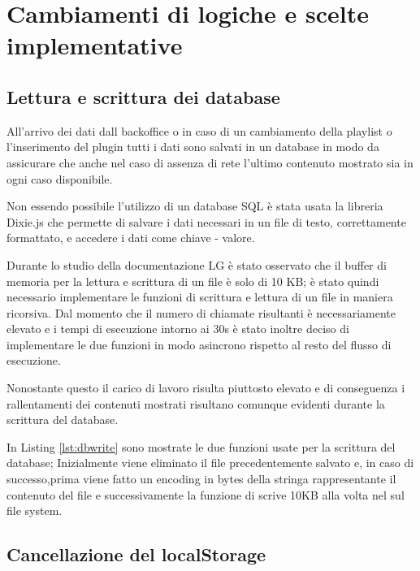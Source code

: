 \section{Cambiamenti di logiche e scelte implementative}
\subsection{Lettura e scrittura dei database} \label{database}

All'arrivo dei dati dall backoffice o in caso di un cambiamento della playlist o l'inserimento del plugin tutti i dati sono salvati in un database in modo da assicurare che anche nel caso di assenza di rete l'ultimo contenuto mostrato sia in ogni caso disponibile.

Non essendo possibile l'utilizzo di un database SQL è stata usata la libreria Dixie.js \cite{dixie} che permette di salvare i dati necessari in un file di testo, correttamente formattato, e accedere i dati come chiave - valore. 

Durante lo studio della documentazione LG è stato osservato che il buffer di memoria per la lettura e scrittura di un file è solo di 10 KB; è stato quindi necessario implementare le funzioni di scrittura e lettura di un file in maniera ricorsiva. Dal momento che il numero di chiamate risultanti è necessariamente elevato e i tempi di esecuzione intorno ai 30s è stato inoltre deciso di implementare le due funzioni in modo asincrono rispetto al resto del flusso di esecuzione. 

Nonostante questo il carico di lavoro risulta piuttosto elevato e di conseguenza i rallentamenti dei contenuti mostrati risultano comunque evidenti durante la scrittura del database. 



In Listing \ref*{lst:dbwrite} sono mostrate le due funzioni usate per la scrittura del database; Inizialmente viene eliminato il file precedentemente salvato e, in caso di successo,prima viene fatto un encoding in bytes della stringa rappresentante il contenuto del file e successivamente la funzione di  scrive 10KB alla volta nel sul file system.

\subsection{Cancellazione del localStorage} \label{freestorage}

